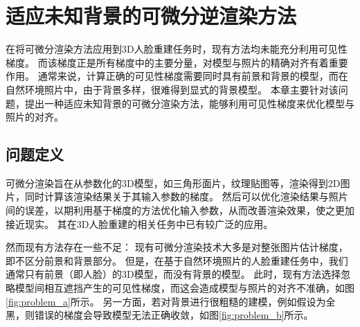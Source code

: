 \chapter{适应未知背景的可微分逆渲染方法}
\label{chap:method}

在将可微分渲染方法应用到3D人脸重建任务时，现有方法均未能充分利用可见性梯度。
而该梯度正是所有梯度中的主要分量，对模型与照片的精确对齐有着重要作用。
通常来说，计算正确的可见性梯度需要同时具有前景和背景的模型，而在自然环境照片中，由于背景多样，很难得到显式的背景模型。
本章主要针对该问题，提出一种适应未知背景的可微分渲染方法，能够利用可见性梯度来优化模型与照片的对齐。

\section{问题定义}

可微分渲染旨在从参数化的3D模型，如三角形面片，纹理贴图等，渲染得到2D图片，同时计算该渲染结果关于其输入参数的梯度。
然后可以优化渲染结果与照片间的误差，以期利用基于梯度的方法优化输入参数，从而改善渲染效果，使之更加接近现实。
其在3D人脸重建的相关任务中已有较广泛的应用。

然而现有方法存在一些不足：
现有可微分渲染技术大多是对整张图片估计梯度，即不区分前景和背景部分。
但是，在基于自然环境照片的人脸重建任务中，我们通常只有前景（即人脸）的3D模型，而没有背景的模型。
此时，现有方法选择忽略模型间相互遮挡产生的可见性梯度，而这会造成模型与照片的对齐不准确，如图\ref{fig:problem_a}所示。
另一方面，若对背景进行很粗糙的建模，例如假设为全黑，则错误的梯度会导致模型无法正确收敛，如图\ref{fig:problem_b}所示。

